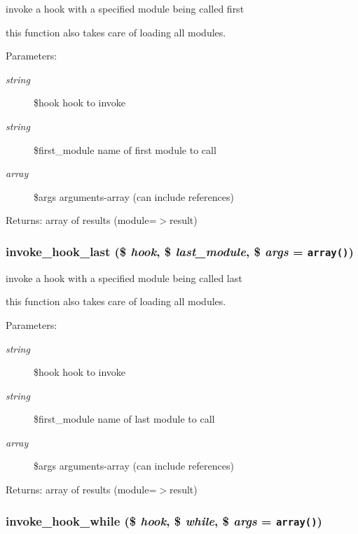 invoke a hook with a specified module being called first

this function also takes care of loading all modules. \begin{Desc}
\item[Parameters:]
\begin{description}
\item[{\em string}]\$hook hook to invoke \item[{\em string}]\$first\_\-module name of first module to call \item[{\em array}]\$args arguments-array (can include references) \end{description}
\end{Desc}
\begin{Desc}
\item[Returns:]array of results (module=$>$result) \end{Desc}
\hypertarget{modules_8inc_8php_e1ff036fae9d272fe1d58dff8a9caed2}{
\subsubsection[{invoke\_\-hook\_\-last}]{\setlength{\rightskip}{0pt plus 5cm}invoke\_\-hook\_\-last (\$ {\em hook}, \/  \$ {\em last\_\-module}, \/  \$ {\em args} = {\tt array()})}}
\label{modules_8inc_8php_e1ff036fae9d272fe1d58dff8a9caed2}


invoke a hook with a specified module being called last

this function also takes care of loading all modules. \begin{Desc}
\item[Parameters:]
\begin{description}
\item[{\em string}]\$hook hook to invoke \item[{\em string}]\$first\_\-module name of last module to call \item[{\em array}]\$args arguments-array (can include references) \end{description}
\end{Desc}
\begin{Desc}
\item[Returns:]array of results (module=$>$result) \end{Desc}
\hypertarget{modules_8inc_8php_66473fc9f24153d85053f1f9c6ed83e4}{
\subsubsection[{invoke\_\-hook\_\-while}]{\setlength{\rightskip}{0pt plus 5cm}invoke\_\-hook\_\-while (\$ {\em hook}, \/  \$ {\em while}, \/  \$ {\em args} = {\tt array()})}}
\label{modules_8inc_8php_66473fc9f24153d85053f1f9c6ed83e4}


